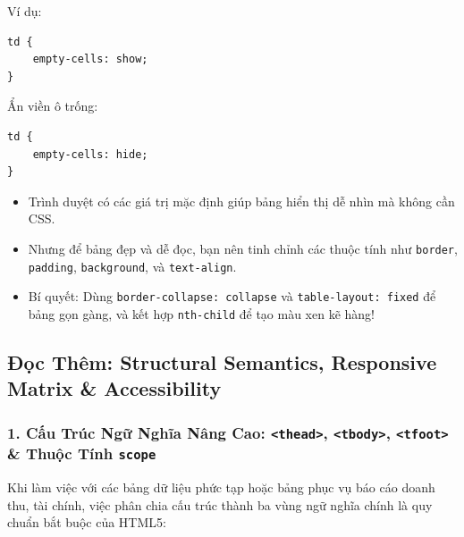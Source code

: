 \documentclass[11pt,oneside]{book}
\newcommand{\codeinline}[1]{\textcolor{accentOrange}{\texttt{#1}}}
\begin{document}
Ví dụ:
\begin{codeWindow}
\begin{lstlisting}[language=HTML5]
td {
    empty-cells: show;
}
\end{lstlisting}
\end{codeWindow}

Ẩn viền ô trống:
\begin{codeWindow}
\begin{lstlisting}[language=HTML5]
td {
    empty-cells: hide;
}
\end{lstlisting}
\end{codeWindow}

\begin{conceptBox}
\begin{itemize}[leftmargin=1.5em, itemsep=2pt, parsep=0pt]
    \item Trình duyệt có các giá trị mặc định giúp bảng hiển thị dễ nhìn mà không cần CSS.
    \item Nhưng để bảng đẹp và dễ đọc, bạn nên tinh chỉnh các thuộc tính như \codeinline{border}, \codeinline{padding}, \codeinline{background}, và \codeinline{text-align}.
    \item Bí quyết: Dùng \codeinline{border-collapse: collapse} và \codeinline{table-layout: fixed} để bảng gọn gàng, và kết hợp \codeinline{nth-child} để tạo màu xen kẽ hàng!
\end{itemize}
\end{conceptBox}

\subsection{Đọc Thêm: Structural Semantics, Responsive Matrix \& Accessibility}

\subsubsection{1. Cấu Trúc Ngữ Nghĩa Nâng Cao: \codeinline{<thead>}, \codeinline{<tbody>}, \codeinline{<tfoot>} \& Thuộc Tính \codeinline{scope}}

Khi làm việc với các bảng dữ liệu phức tạp hoặc bảng phục vụ báo cáo doanh thu, tài chính, việc phân chia cấu trúc thành ba vùng ngữ nghĩa chính là quy chuẩn bắt buộc của HTML5:
\end{document}
